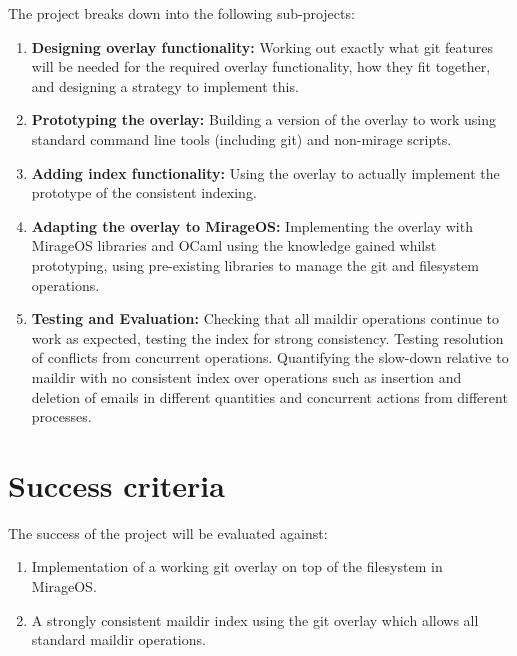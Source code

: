 \documentclass[12pt,a4paper,twoside]{article}
\begin{document}
The project breaks down into the following sub-projects:

\begin{enumerate}

    \item \textbf{Designing overlay functionality:} Working out exactly what git features will be needed for the required overlay functionality, how they fit together, and designing a strategy to implement this.

    \item \textbf{Prototyping the overlay:} Building a version of the overlay to work using standard command line tools (including git) and non-mirage scripts.

    \item \textbf{Adding index functionality:} Using the overlay to actually implement the prototype of the consistent indexing.

    \item \textbf{Adapting the overlay to MirageOS:} Implementing the overlay with MirageOS libraries and OCaml using the knowledge gained whilst prototyping, using pre-existing libraries to manage the git and filesystem operations.

    \item \textbf{Testing and Evaluation:} Checking that all maildir operations continue to work as expected, testing the index for strong consistency. Testing resolution of conflicts from concurrent operations. Quantifying the slow-down relative to maildir with no consistent index over operations such as insertion and deletion of emails in different quantities and concurrent actions from different processes.

\end{enumerate}

\section*{Success criteria}

The success of the project will be evaluated against:

\begin{enumerate}

    \item Implementation of a working git overlay on top of the filesystem in MirageOS.

    \item A strongly consistent maildir index using the git overlay which allows all standard maildir operations.

\end{enumerate}
\end{document}
